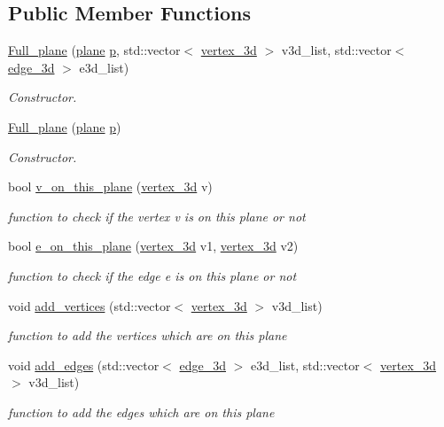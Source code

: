 \subsection*{Public Member Functions}
\begin{DoxyCompactItemize}
\item 
\hyperlink{class_full__plane_adc74c83d8c266176e717e54aff561a63}{Full\+\_\+plane} (\hyperlink{classplane}{plane} \hyperlink{class_full__plane_ad65bd61131d3c78d146592919a43fc3e}{p}, std\+::vector$<$ \hyperlink{classvertex__3d}{vertex\+\_\+3d} $>$ v3d\+\_\+list, std\+::vector$<$ \hyperlink{classedge__3d}{edge\+\_\+3d} $>$ e3d\+\_\+list)
\begin{DoxyCompactList}\small\item\em Constructor. \end{DoxyCompactList}\item 
\hyperlink{class_full__plane_a2dc5c95254d2537c62f6616418f53b6b}{Full\+\_\+plane} (\hyperlink{classplane}{plane} \hyperlink{class_full__plane_ad65bd61131d3c78d146592919a43fc3e}{p})
\begin{DoxyCompactList}\small\item\em Constructor. \end{DoxyCompactList}\item 
bool \hyperlink{class_full__plane_ad46ab0d796a3bfc10e7e8f4c2fa85bfc}{v\+\_\+on\+\_\+this\+\_\+plane} (\hyperlink{classvertex__3d}{vertex\+\_\+3d} v)
\begin{DoxyCompactList}\small\item\em function to check if the vertex v is on this plane or not \end{DoxyCompactList}\item 
bool \hyperlink{class_full__plane_a3bcb8b532890ad5b4abc7ed270b039de}{e\+\_\+on\+\_\+this\+\_\+plane} (\hyperlink{classvertex__3d}{vertex\+\_\+3d} v1, \hyperlink{classvertex__3d}{vertex\+\_\+3d} v2)
\begin{DoxyCompactList}\small\item\em function to check if the edge e is on this plane or not \end{DoxyCompactList}\item 
void \hyperlink{class_full__plane_a02b7ba0ae30cc09e077ac6d4b46a2db2}{add\+\_\+vertices} (std\+::vector$<$ \hyperlink{classvertex__3d}{vertex\+\_\+3d} $>$ v3d\+\_\+list)
\begin{DoxyCompactList}\small\item\em function to add the vertices which are on this plane \end{DoxyCompactList}\item 
void \hyperlink{class_full__plane_a155473c38443048865b1be6346cd011e}{add\+\_\+edges} (std\+::vector$<$ \hyperlink{classedge__3d}{edge\+\_\+3d} $>$ e3d\+\_\+list, std\+::vector$<$ \hyperlink{classvertex__3d}{vertex\+\_\+3d} $>$ v3d\+\_\+list)
\begin{DoxyCompactList}\small\item\em function to add the edges which are on this plane \end{DoxyCompactList}\end{DoxyCompactItemize}
